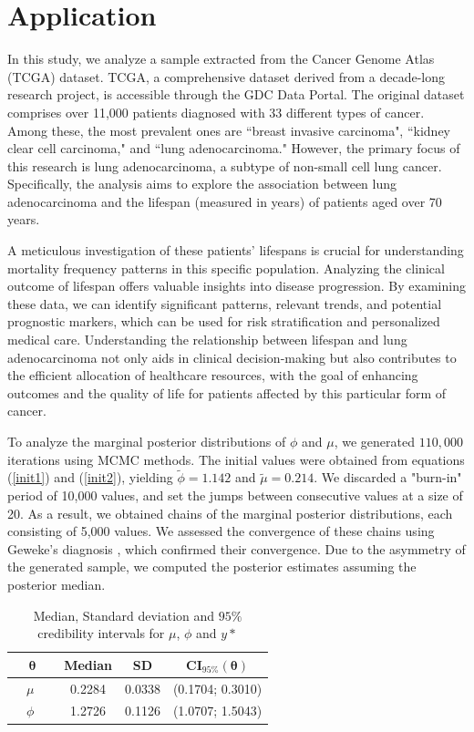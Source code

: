 \documentclass[]{interact}
\theoremstyle{plain}%
\theoremstyle{definition}
\theoremstyle{remark}
\begin{document}
\section{Application}

In this study, we analyze a sample extracted from the Cancer Genome Atlas (TCGA) dataset. TCGA, a comprehensive dataset derived from a decade-long research project, is accessible through the GDC Data Portal. The original dataset comprises over 11,000 patients diagnosed with 33 different types of cancer. Among these, the most prevalent ones are  ``breast invasive carcinoma", ``kidney clear cell carcinoma," and ``lung adenocarcinoma." However, the primary focus of this research is lung adenocarcinoma, a subtype of non-small cell lung cancer. Specifically, the analysis aims to explore the association between lung adenocarcinoma and the lifespan (measured in years) of patients aged over 70 years.

A meticulous investigation of these patients' lifespans is crucial for understanding mortality frequency patterns in this specific population. Analyzing the clinical outcome of lifespan offers valuable insights into disease progression. By examining these data, we can identify significant patterns, relevant trends, and potential prognostic markers, which can be used for risk stratification and personalized medical care. Understanding the relationship between lifespan and lung adenocarcinoma not only aids in clinical decision-making but also contributes to the efficient allocation of healthcare resources, with the goal of enhancing outcomes and the quality of life for patients affected by this particular form of cancer.

To analyze the marginal posterior distributions of $\phi$ and $\mu$, we generated $110,000$ iterations using MCMC methods. The initial values were obtained from equations (\ref{init1}) and (\ref{init2}), yielding $\tilde{\phi}=1.142$ and $\tilde{\mu}=0.214$. We discarded a "burn-in" period of 10,000 values, and set the jumps between consecutive values at a size of 20. As a result, we obtained chains of the marginal posterior distributions, each consisting of 5,000 values. We assessed the convergence of these chains using Geweke's diagnosis \cite{geweke1991evaluating}, which confirmed their convergence.  Due to the asymmetry of the generated sample, we computed the posterior estimates assuming the posterior median.
\begin{table}[!h]
	\caption{Median, Standard deviation and  $95\%$ credibility intervals for $\mu$, $\phi$ and $y*$}
	\centering %
{\small
	{\begin{tabular}{ c | c |  c| c }
			\hline
			$\boldsymbol{\theta}$  & Median & SD & CI$_{95\%}(\boldsymbol{\theta})$ \\ \hline
			\ \ $\mu$ \ \   & 0.2284 &  0.0338  &  (0.1704; 0.3010)  \\ \hline
			\ \ $\phi$   \ \  &  1.2726 & 0.1126 &  (1.0707; 1.5043) \\ \hline
		\end{tabular}}\label{resairplane} }
\end{table}
\end{document}
